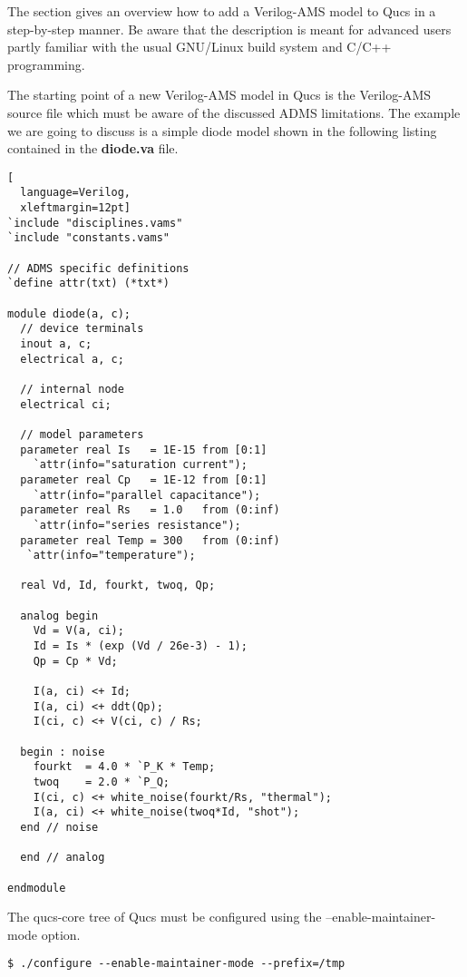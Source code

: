 The section gives an overview how to add a Verilog-AMS model to Qucs
in a step-by-step manner.  Be aware that the description is meant for
advanced users partly familiar with the usual GNU/Linux build system
and C/C++ programming.


The starting point of a new Verilog-AMS model in Qucs is the
Verilog-AMS source file which must be aware of the discussed ADMS
limitations.  The example we are going to discuss is a simple diode
model shown in the following listing contained in the
\textbf{diode.va} file.

\begin{lstlisting}[
  language=Verilog,
  xleftmargin=12pt]
`include "disciplines.vams"
`include "constants.vams"

// ADMS specific definitions 
`define attr(txt) (*txt*) 

module diode(a, c);  
  // device terminals
  inout a, c;
  electrical a, c;

  // internal node
  electrical ci;

  // model parameters
  parameter real Is   = 1E-15 from [0:1]
    `attr(info="saturation current");
  parameter real Cp   = 1E-12 from [0:1]
    `attr(info="parallel capacitance");
  parameter real Rs   = 1.0   from (0:inf)
    `attr(info="series resistance");
  parameter real Temp = 300   from (0:inf)
   `attr(info="temperature");

  real Vd, Id, fourkt, twoq, Qp;

  analog begin
    Vd = V(a, ci);
    Id = Is * (exp (Vd / 26e-3) - 1);
    Qp = Cp * Vd;

    I(a, ci) <+ Id;
    I(a, ci) <+ ddt(Qp);
    I(ci, c) <+ V(ci, c) / Rs;

  begin : noise
    fourkt  = 4.0 * `P_K * Temp;
    twoq    = 2.0 * `P_Q;
    I(ci, c) <+ white_noise(fourkt/Rs, "thermal");
    I(a, ci) <+ white_noise(twoq*Id, "shot");
  end // noise

  end // analog

endmodule
\end{lstlisting}


The qucs-core tree of Qucs must be configured using the
--enable-maintainer-mode option.
\begin{Verbatim}[fontsize=\small]
  $ ./configure --enable-maintainer-mode --prefix=/tmp
\end{Verbatim}

